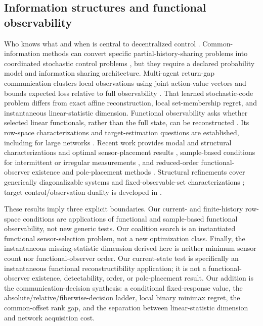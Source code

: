 \documentclass[10pt,twocolumn,twoside]{IEEEtran}
\begin{document}
\subsection{Information structures and functional observability}

Who knows what and when is central to decentralized control
\cite{witsenhausen1971information,ho1972team}.  Common-information methods can
convert specific partial-history-sharing problems into coordinated stochastic
control problems \cite{nayyar2013common}, but they require a declared
probability model and information sharing architecture.  Multi-agent
return-gap communication clusters local observations using joint action-value
vectors and bounds expected loss relative to full observability
\cite{chen2024rgmcomm}.  That learned stochastic-code problem differs from
exact affine reconstruction, local set-membership regret, and instantaneous
linear-statistic dimension.  Functional
observability asks whether selected linear functionals, rather than the full
state, can be reconstructed \cite{fernando2010functional}.  Its row-space
characterizations and target-estimation questions are established, including
for large networks \cite{montanari2022functional}.  Recent work provides
modal and structural characterizations and optimal sensor-placement results
\cite{zhang2025functionalsensor}, sample-based conditions for intermittent or
irregular measurements \cite{krauss2025samplebased}, and reduced-order
functional-observer existence and pole-placement methods
\cite{darouach2025functional}.  Structural refinements cover generically
diagonalizable systems \cite{zhang2025generic} and fixed-observable-set
characterizations \cite{commault2026note}; target control/observation duality
is developed in \cite{montanari2025duality}.

These results imply three explicit boundaries.  Our current- and
finite-history row-space conditions are applications of functional and
sample-based functional observability, not new generic tests.  Our coalition
search is an instantiated functional sensor-selection problem, not a new
optimization class.  Finally, the instantaneous missing-statistic dimension
derived here is neither minimum sensor count nor functional-observer order.
Our current-state test is specifically an instantaneous functional
reconstructibility application; it is not a functional-observer existence,
detectability, order, or pole-placement result.  Our addition is the
communication-decision synthesis: a conditional fixed-response value, the
absolute/relative/fiberwise-decision ladder, local binary minimax regret, the
common-offset rank gap, and the separation between linear-statistic dimension
and network acquisition cost.
\end{document}
